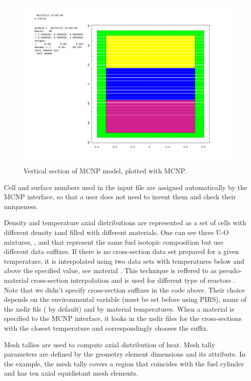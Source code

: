 \documentclass[a4paper,10pt,twocolumn,english]{sphinxsnamc2013}
\begin{document}
\begin{figure}[htbp]
\centering
\capstart

\includegraphics{i__p02.pdf}
\caption{Vertical section of MCNP model, plotted with MCNP. \label{pic:plot}}\end{figure}

Cell and surface numbers used in the input file are assigned automatically by
the MCNP interface, so that a user does not need to invent them and check their
uniqueness.

Density and temperature axial distributions are represented as a
set of cells with different density iand filled with different materials.
One can see three U-O mixtures, ,  and  that represent the
same fuel isotopic composition but use different data suffixes. If there is no
cross-section data set prepared for a given temperature, it is interpolated
using two data sets with temperatures below and above the specified value, see
material . This technique is reffered to as pseudo-material cross-section
interpolation and is used for different type of reactors
\cite{pseudoMat2008,pseudoMatAlHamry}.  Note that we didn't
specify cross-section suffixes in the code above. Their choice depends on the
 environmental variable (must be set before using PIRS), name of
the xsdir file ( by default) and by material temperatures. When a
material is specified to the MCNP interface, it looks in the xsdir files for
the cross-sections with the closest temperature and correspondingly chooses the
suffix.

Mesh tallies are used to compute axial distribution of heat. Mesh tally parameters
are defined by the geometry element dimensions and its  attribute. In
the example, the mesh tally covers a region that coincides with the fuel
cylinder and has ten axial equidistant mesh elements.
\end{document}
